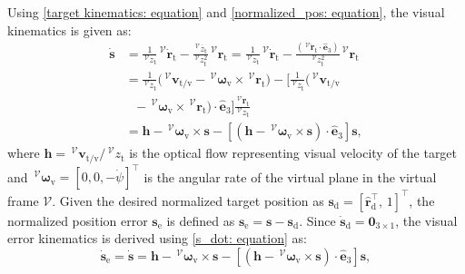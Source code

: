 \documentclass[lettersize,journal]{IEEEtran}
\begin{document}
Using \eqref{target kinematics: equation} and \eqref{normalized_pos: equation}, the visual kinematics is given as:
\begin{align} \label{s_dot: equation}
    \dot{\boldsymbol{s}} &= \frac{1}{\,^\mathcal{V} z_{\text{t}}}\,^\mathcal{V} \dot{\boldsymbol{r}}_{\text{t}} - \frac{\,^\mathcal{V} \dot{z_{\text{t}}}}{\,^\mathcal{V} z_{\text{t}}^2}\,^\mathcal{V} \boldsymbol{r}_{\text{t}} = \frac{1}{\,^\mathcal{V} z_{\text{t}}} \,^\mathcal{V} \dot{\boldsymbol{r}}_{\text{t}} - \frac{(\,^\mathcal{V} \dot{\boldsymbol{r}}_{\text{t}} \cdot \hat{\boldsymbol{e}}_3)}{\,^\mathcal{V} z_{\text{t}}^2}\,^\mathcal{V} \boldsymbol{r}_{\text{t}} \nonumber \\
    &= \frac{1}{\,^\mathcal{V} z_{\text{t}}} \big( \,^\mathcal{V} \boldsymbol{v}_{\text{t/v}} - \,^\mathcal{V} \boldsymbol{\omega}_{\text{v}} \times \,^\mathcal{V} \boldsymbol{r}_{\text{t}}\big) - \bigg[\frac{1}{\,^\mathcal{V} z_{\text{t}}} \big( \,^\mathcal{V} \boldsymbol{v}_{\text{t/v}} \nonumber \\
    &~~~ - \,^\mathcal{V} \boldsymbol{\omega}_{\text{v}} \times \,^\mathcal{V} \boldsymbol{r}_{\text{t}}\big) \cdot \hat{\boldsymbol{e}}_3 \bigg] \frac{\,^\mathcal{V} \boldsymbol{r}_{\text{t}}}{\,^\mathcal{V} z_{\text{t}}} \nonumber \\
    &= \boldsymbol{h} - \,^\mathcal{V} \boldsymbol{\omega}_{\text{v}} \times \boldsymbol{s} - \left[\left( \boldsymbol{h} - \,^\mathcal{V} \boldsymbol{\omega}_{\text{v}} \times \boldsymbol{s} \right) \cdot \hat{\boldsymbol{e}}_3 \right] \boldsymbol{s},
\end{align}
where $\boldsymbol{h} = \,^\mathcal{V} \boldsymbol{v}_{\text{t/v}}/\,^\mathcal{V} z_{\text{t}}$ is the optical flow representing visual velocity of the target and  $\,^\mathcal{V} \boldsymbol{\omega}_{\text{v}} = [0, 0, -\dot{\psi}]^\top$ is the angular rate of the virtual plane in the virtual frame $\mathcal{V}$.
Given the desired normalized target position as $\boldsymbol{s}_\text{d} = [\hat{\boldsymbol{r}}_\text{d}^\top, \, 1]^\top$, the normalized position error $\boldsymbol{s}_\text{e}$ is defined as $\boldsymbol{s}_\text{e} = \boldsymbol{s} - \boldsymbol{s}_\text{d}$.
Since $\dot{\boldsymbol{s}}_\text{d} = \boldsymbol{0}_{3 \times 1}$, the visual error kinematics is derived using \eqref{s_dot: equation} as:
\begin{equation} \label{s_e_dot: equation}
    \dot{\boldsymbol{s}}_\text{e} = \dot{\boldsymbol{s}} = \boldsymbol{h} - \,^\mathcal{V} \boldsymbol{\omega}_{\text{v}} \times \boldsymbol{s} - \left[\left( \boldsymbol{h} - \,^\mathcal{V} \boldsymbol{\omega}_{\text{v}} \times \boldsymbol{s} \right) \cdot \hat{\boldsymbol{e}}_3 \right] \boldsymbol{s},
\end{equation}
\end{document}
